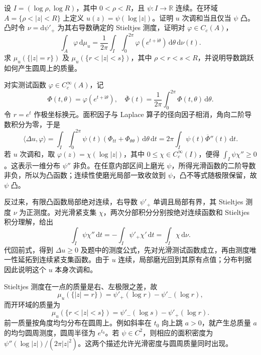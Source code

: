 \begin{exercise}[径向次调和性与凸函数的斜率]\label{b3:ex:15-draft-02}
设 \(I=(\log\rho,\log R)\)，其中 \(0<\rho<R\)，且 \(\psi:I\to\mathbb R\) 连续。在环域 \(A=\{\rho<|z|<R\}\) 上定义 \(u(z)=\psi(\log|z|)\)。证明 \(u\) 次调和当且仅当 \(\psi\) 凸。凸时令 \(\nu=\mathrm d\psi'_+\) 为其右导数确定的 Stieltjes 测度，证明对 \(\varphi\in C_c(A)\)，
\[
 \int_A\varphi\,\mathrm d\mu_u
 =\frac1{2\pi}\int_I\int_0^{2\pi}
       \varphi(e^{t+\mathrm i\theta})\,\mathrm d\theta\,\mathrm d\nu(t).
\]
求 \(\mu_u(\{|z|=r\})\) 及 \(\mu_u(\{r<|z|<s\})\)，其中 \(\rho<r<s<R\)，并说明导数跳跃如何产生圆周上的质量。
\end{exercise}
\begin{solution}
对实测试函数 \(\varphi\in C_c^\infty(A)\)，记
\[
 \Phi(t,\theta)=\varphi(e^{t+\mathrm i\theta}),\quad
 \overline\Phi(t)=\frac1{2\pi}\int_0^{2\pi}\Phi(t,\theta)\,\mathrm d\theta.
\]
令 \(r=e^t\) 作极坐标换元。面积因子与 Laplace 算子的径向因子相消，角向二阶导数积分为零，于是
\[
 \langle\Delta u,\varphi\rangle
 =\int_I\int_0^{2\pi}\psi(t)
       (\Phi_{tt}+\Phi_{\theta\theta})\,\mathrm d\theta\,\mathrm dt
 =2\pi\int_I\psi(t)\overline\Phi''(t)\,\mathrm dt.
\]
若 \(u\) 次调和，取 \(\varphi(z)=\chi(\log|z|)\)，其中 \(0\le\chi\in C_c^\infty(I)\)，便得 \(\int_I\psi\chi''\ge0\)。这表示一维分布 \(\psi''\) 非负。在任意内部区间上磨光 \(\psi\)，所得光滑函数的二阶导数非负，所以为凸函数；连续性使磨光局部一致收敛到 \(\psi\)，凸不等式随极限保留，故 \(\psi\) 凸。

反过来，有限凸函数局部绝对连续，右导数 \(\psi'_+\) 单调且局部有界，其 Stieltjes 测度 \(\nu\) 为正测度。对光滑紧支集 \(\chi\)，两次分部积分分别按绝对连续函数和 Stieltjes 积分理解，给出
\[
 \int_I\psi\chi''\,\mathrm dt
 =-\int_I\psi'_+\chi'\,\mathrm dt
 =\int_I\chi\,\mathrm d\nu.
\]
代回前式，得到 \(\Delta u\ge0\) 及题中的测度公式，先对光滑测试函数成立，再由测度唯一性延拓到连续紧支集函数。由于 \(u\) 连续，局部磨光回到其原有点值；分布判据因此说明这个 \(u\) 本身次调和。

Stieltjes 测度在一点的质量是右、左极限之差，故
\[
 \mu_u(\{|z|=r\})
 =\psi'_+(\log r)-\psi'_-(\log r),
\]
而开环域的质量为
\[
 \mu_u(\{r<|z|<s\})
 =\psi'_-(\log s)-\psi'_+(\log r).
\]
前一质量按角度均匀分布在圆周上。例如斜率在 \(t_0\) 向上跳 \(a>0\)，就产生总质量 \(a\) 的均匀圆周测度，圆周半径为 \(e^{t_0}\)。若 \(\psi\in C^2\)，则相应的面积密度为 \(\psi''(\log|z|)/(2\pi|z|^2)\)。这两个描述允许光滑密度与圆周质量同时出现。
\end{solution}

